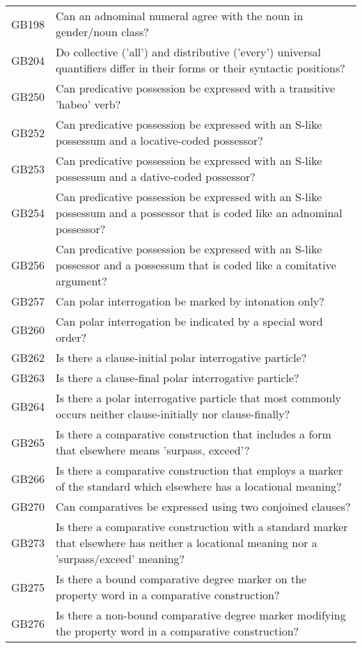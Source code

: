 \begin{longtable}{p{3cm}p{12cm}}
  GB198 & Can an adnominal numeral agree with the noun in gender/noun class? \\ 
  GB204 & Do collective ('all') and distributive ('every') universal quantifiers differ in their forms or their syntactic positions? \\ 
  GB250 & Can predicative possession be expressed with a transitive 'habeo' verb? \\ 
  GB252 & Can predicative possession be expressed with an S-like possessum and a locative-coded possessor? \\ 
  GB253 & Can predicative possession be expressed with an S-like possessum and a dative-coded possessor? \\ 
  GB254 & Can predicative possession be expressed with an S-like possessum and a possessor that is coded like an adnominal possessor? \\ 
  GB256 & Can predicative possession be expressed with an S-like possessor and a possessum that is coded like a comitative argument? \\ 
  GB257 & Can polar interrogation be marked by intonation only? \\ 
  GB260 & Can polar interrogation be indicated by a special word order? \\ 
  GB262 & Is there a clause-initial polar interrogative particle? \\ 
  GB263 & Is there a clause-final polar interrogative particle? \\ 
  GB264 & Is there a polar interrogative particle that most commonly occurs neither clause-initially nor clause-finally? \\ 
  GB265 & Is there a comparative construction that includes a form that elsewhere means 'surpass, exceed'? \\ 
  GB266 & Is there a comparative construction that employs a marker of the standard which elsewhere has a locational meaning? \\ 
  GB270 & Can comparatives be expressed using two conjoined clauses? \\ 
  GB273 & Is there a comparative construction with a standard marker that elsewhere has neither a locational meaning nor a 'surpass/exceed' meaning? \\ 
  GB275 & Is there a bound comparative degree marker on the property word in a comparative construction? \\ 
  GB276 & Is there a non-bound comparative degree marker modifying the property word in a comparative construction? \\ 

\end{longtable}
